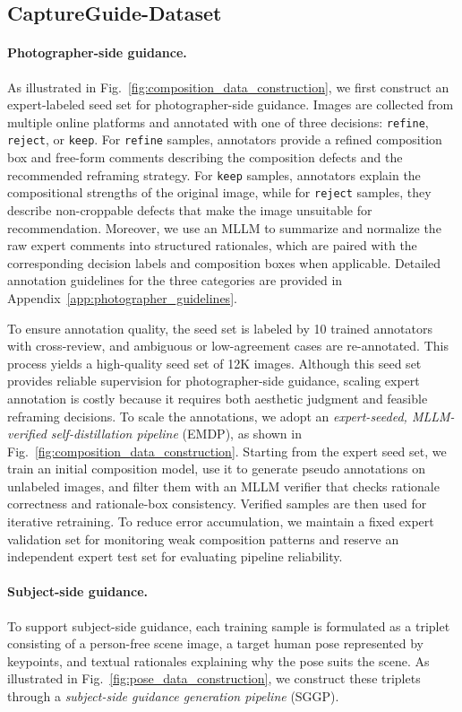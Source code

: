 \documentclass{llmxive}
\begin{document}
\subsection{CaptureGuide-Dataset}
\paragraph{Photographer-side guidance.}
As illustrated in Fig.~\ref{fig:composition_data_construction}, we first construct an expert-labeled seed set for photographer-side guidance. Images are collected from multiple online platforms and annotated with one of three decisions: \texttt{refine}, \texttt{reject}, or \texttt{keep}. For \texttt{refine} samples, annotators provide a refined composition box and free-form comments describing the composition defects and the recommended reframing strategy. For \texttt{keep} samples, annotators explain the compositional strengths of the original image, while for \texttt{reject} samples, they describe non-croppable defects that make the image unsuitable for recommendation. Moreover, we use an MLLM to summarize and normalize the raw expert comments into structured rationales, which are paired with the corresponding decision labels and composition boxes when applicable. Detailed annotation guidelines for the three categories are provided in Appendix~\ref{app:photographer_guidelines}.

To ensure annotation quality, the seed set is labeled by 10 trained annotators with cross-review, and ambiguous or low-agreement cases are re-annotated. This process yields a high-quality seed set of 12K images. Although this seed set provides reliable supervision for photographer-side guidance, scaling expert annotation is costly because it requires both aesthetic judgment and feasible reframing decisions. To scale the annotations, we adopt an \textit{expert-seeded, MLLM-verified self-distillation pipeline} (EMDP), as shown in Fig.~\ref{fig:composition_data_construction}. Starting from the expert seed set, we train an initial composition model, use it to generate pseudo annotations on unlabeled images, and filter them with an MLLM verifier that checks rationale correctness and rationale-box consistency. Verified samples are then used for iterative retraining. To reduce error accumulation, we maintain a fixed expert validation set for monitoring weak composition patterns and reserve an independent expert test set for evaluating pipeline reliability.


\paragraph{Subject-side guidance.}
To support subject-side guidance, each training sample is formulated as a triplet consisting of a person-free scene image, a target human pose represented by keypoints, and textual rationales explaining why the pose suits the scene. As illustrated in Fig.~\ref{fig:pose_data_construction}, we construct these triplets through a \textit{subject-side guidance generation pipeline} (SGGP).
\end{document}
